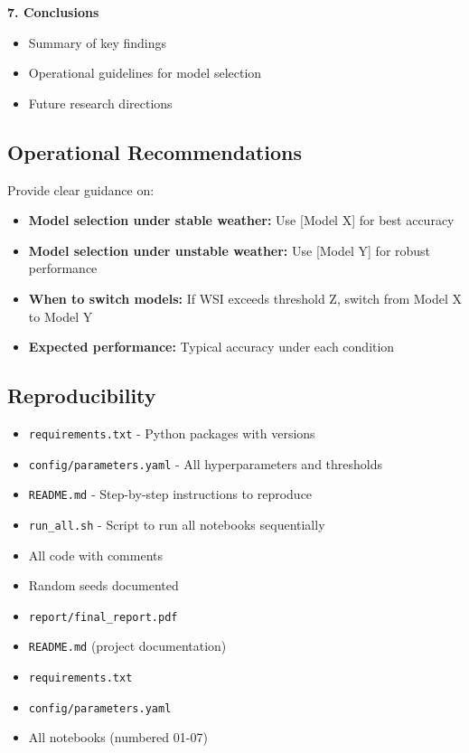 \documentclass[11pt,a4paper]{article}
\begin{document}
\textbf{7. Conclusions}
\begin{itemize}
    \item Summary of key findings
    \item Operational guidelines for model selection
    \item Future research directions
\end{itemize}

\subsection{Operational Recommendations}

Provide clear guidance on:
\begin{itemize}
    \item \textbf{Model selection under stable weather:} Use [Model X] for best accuracy
    \item \textbf{Model selection under unstable weather:} Use [Model Y] for robust performance
    \item \textbf{When to switch models:} If WSI exceeds threshold Z, switch from Model X to Model Y
    \item \textbf{Expected performance:} Typical accuracy under each condition
\end{itemize}

\subsection{Reproducibility}

\begin{itemize}
    \item \texttt{requirements.txt} - Python packages with versions
    \item \texttt{config/parameters.yaml} - All hyperparameters and thresholds
    \item \texttt{README.md} - Step-by-step instructions to reproduce
    \item \texttt{run\_all.sh} - Script to run all notebooks sequentially
    \item All code with comments
    \item Random seeds documented
\end{itemize}

\begin{deliverablebox}
\begin{itemize}
    \item \texttt{report/final\_report.pdf}
    \item \texttt{README.md} (project documentation)
    \item \texttt{requirements.txt}
    \item \texttt{config/parameters.yaml}
    \item All notebooks (numbered 01-07)
\end{itemize}
\end{deliverablebox}
\end{document}
